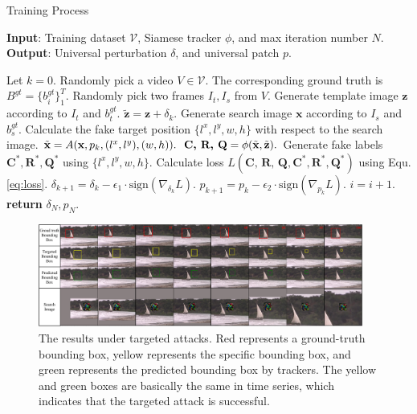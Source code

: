 \documentclass{article}
\begin{document}
\begin{algorithm}[tb]
\caption{Training Process}
\label{alg:algorithm}
\textbf{Input}: Training dataset $\mathcal{V}$, Siamese tracker $\phi$, and max iteration number $N$.\\
\textbf{Output}: Universal perturbation $\delta$, and universal patch $p$.
\begin{algorithmic}[1] %
\STATE Let $k = 0$.
\STATE Randomly pick a video $V\in \mathcal{V}$. The corresponding ground truth is $B^{gt}=\{b^{gt}_i\}^T_1$.
\STATE Randomly pick two frames $I_t, I_s$ from $V$.
\STATE Generate template image $\textbf{z}$ according to $I_t$ and $b^{gt}_t$.
\STATE $\tilde{\textbf{z}} = \textbf{z} + \delta_k.$
\STATE Generate search image $\textbf{x}$ according to $I_s$ and $b^{gt}_s$.
\STATE Calculate the fake target position $\{l^x, l^y, w, h\}$ with respect to the search image.
\STATE $\tilde{\textbf x} = A(\textbf x, p_k, (l^x, l^y), (w, h)).$
\STATE $\textbf{C, R, Q} = \phi(\tilde {\textbf x}, \tilde{\textbf z}).$
\STATE Generate fake labels $\textbf{C}^*,\textbf{R}^*,\textbf{Q}^*$ using $\{l^x, l^y, w, h\}$.
\STATE Calculate loss $L(\textbf{C, R, Q}, \textbf{C}^*, \textbf{R}^*, \textbf{Q}^*)$ using Equ. \ref{eq:loss}.
\STATE $\delta_{k+1} = \delta_{k} - \epsilon_1 \cdot \text{sign}(\nabla_{\delta_k}L).$
\STATE $p_{k+1} = p_{k} - \epsilon_2 \cdot \text{sign}(\nabla_{p_k}L).$
\STATE $i = i + 1.$
\ENDWHILE
\STATE \textbf{return} $\delta_N, p_N.$
\end{algorithmic}
\label{alg}
\end{algorithm}

\begin{figure}[t]
\centering
\includegraphics[width=0.95\textwidth]{images/vis_v4.pdf}
\caption{The results under targeted attacks. Red represents a ground-truth bounding box, yellow represents the specific bounding box, and green represents the predicted bounding box by trackers. The yellow and green boxes are basically the same in time series, which indicates that the targeted attack is successful.}
\label{fig:vis}
\end{figure}
\end{document}
